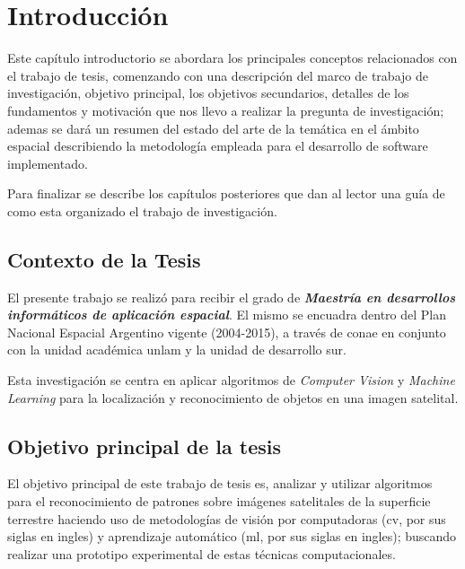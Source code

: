 \chapter{Introducción}\label{chap:introduccion}

Este capítulo introductorio se abordara los principales conceptos relacionados con el trabajo de tesis, comenzando con una descripción del marco de trabajo de investigación, objetivo principal, los objetivos secundarios, detalles de los fundamentos y motivación que nos llevo a realizar la pregunta de investigación; ademas se dará un resumen del estado del arte de la temática en el ámbito espacial describiendo la metodología empleada para el desarrollo de software implementado. 

Para finalizar se describe los capítulos posteriores que dan al lector una guía de como esta organizado el trabajo de investigación.


\section{Contexto de la Tesis}\label{sec:contexto}
El presente trabajo se realizó para recibir el grado de \textbf{\textit{Maestría en desarrollos informáticos de aplicación espacial}}. El mismo se encuadra dentro del Plan Nacional Espacial Argentino vigente (2004-2015), a través de \ac{conae} en conjunto con la unidad académica \ac{unlam} y la unidad de desarrollo \ac{sur}.

Esta investigación se centra en aplicar  algoritmos de \textit{Computer Vision}  y \textit{Machine Learning} para la localización y reconocimiento de objetos en una imagen satelital.


\section{Objetivo principal de la tesis}\label{sec:obj_general}

El objetivo principal de este trabajo de tesis es, analizar y utilizar algoritmos para el  reconocimiento de patrones sobre imágenes satelitales de la superficie terrestre haciendo uso de metodologías de visión por computadoras (\ac{cv}, por sus siglas en ingles) y aprendizaje automático (\ac{ml}, por sus siglas en ingles); buscando realizar una prototipo experimental de estas técnicas computacionales.


